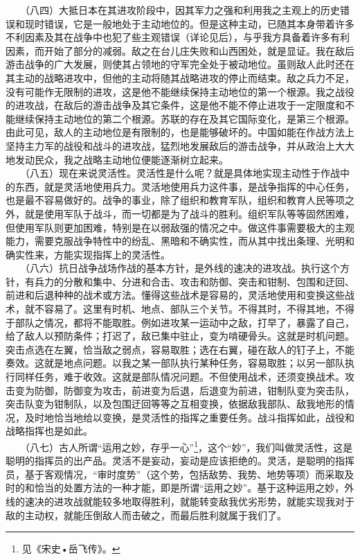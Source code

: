 \documentclass[cn,11pt,chinese]{elegantbook}
\begin{document}
　　（八四）大抵日本在其进攻阶段中，因其军力之强和利用我之主观上的历史错误和现时错误，它是一般地处于主动地位的。但是这种主动，已随其本身带着许多不利因素及其在战争中也犯了些主观错误（详论见后），与乎我方具备着许多有利因素，而开始了部分的减弱。敌之在台儿庄失败和山西困处，就是显证。我在敌后游击战争的广大发展，则使其占领地的守军完全处于被动地位。虽则敌人此时还在其主动的战略进攻中，但他的主动将随其战略进攻的停止而结束。敌之兵力不足，没有可能作无限制的进攻，这是他不能继续保持主动地位的第一个根源。我之战役的进攻战，在敌后的游击战争及其它条件，这是他不能不停止进攻于一定限度和不能继续保持主动地位的第二个根源。苏联的存在及其它国际变化，是第三个根源。由此可见，敌人的主动地位是有限制的，也是能够破坏的。中国如能在作战方法上坚持主力军的战役和战斗的进攻战，猛烈地发展敌后的游击战争，并从政治上大大地发动民众，我之战略主动地位便能逐渐树立起来。\\
　　（八五）现在来说灵活性。灵活性是什么呢？就是具体地实现主动性于作战中的东西，就是灵活地使用兵力。灵活地使用兵力这件事，是战争指挥的中心任务，也是最不容易做好的。战争的事业，除了组织和教育军队，组织和教育人民等项之外，就是使用军队于战斗，而一切都是为了战斗的胜利。组织军队等等固然困难，但使用军队则更加困难，特别是在以弱敌强的情况之中。做这件事需要极大的主观能力，需要克服战争特性中的纷乱、黑暗和不确实性，而从其中找出条理、光明和确实性来，方能实现指挥上的灵活性。\\
　　（八六）抗日战争战场作战的基本方针，是外线的速决的进攻战。执行这个方针，有兵力的分散和集中、分进和合击、攻击和防御、突击和钳制、包围和迂回、前进和后退种种的战术或方法。懂得这些战术是容易的，灵活地使用和变换这些战术，就不容易了。这里有时机、地点、部队三个关节。不得其时，不得其地，不得于部队之情况，都将不能取胜。例如进攻某一运动中之敌，打早了，暴露了自己，给了敌人以预防条件；打迟了，敌已集中驻止，变为啃硬骨头。这就是时机问题。突击点选在左翼，恰当敌之弱点，容易取胜；选在右翼，碰在敌人的钉子上，不能奏效。这就是地点问题。以我之某一部队执行某种任务，容易取胜；以另一部队执行同样任务，难于收效。这就是部队情况问题。不但使用战术，还须变换战术。攻击变为防御，防御变为攻击，前进变为后退，后退变为前进，钳制队变为突击队，突击队变为钳制队，以及包围迂回等等之互相变换，依据敌我部队、敌我地形的情况，及时地恰当地给以变换，是灵活性的指挥之重要任务。战斗指挥如此，战役和战略指挥也是如此。\\
　　（八七）古人所谓“运用之妙，存乎一心”\footnote[37]{ 见《宋史•岳飞传》。}，这个“妙”，我们叫做灵活性，这是聪明的指挥员的出产品。灵活不是妄动，妄动是应该拒绝的。灵活，是聪明的指挥员，基于客观情况，“审时度势”（这个势，包括敌势、我势、地势等项）而采取及时的和恰当的处置方法的一种才能，即是所谓“运用之妙”。基于这种运用之妙，外线的速决的进攻战就能较多地取得胜利，就能转变敌我优劣形势，就能实现我对于敌的主动权，就能压倒敌人而击破之，而最后胜利就属于我们了。\\
\end{document}
